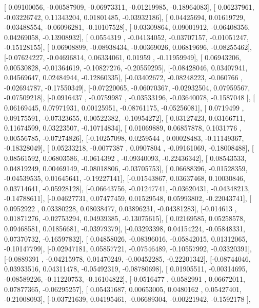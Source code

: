 \documentclass{article}
\begin{document}
       [ 0.09100056, -0.00587909, -0.06973311, -0.01219985, -0.18964083],
       [ 0.06237961, -0.03226742,  0.11343204,  0.01801485, -0.03932186],
       [ 0.04425694,  0.01619729, -0.03488554, -0.06096281, -0.10107528],
       [-0.03309864,  0.09001912, -0.06408356,  0.04269058, -0.13908932],
       [ 0.0554319 , -0.04134052, -0.03707157, -0.01051247, -0.15128155],
       [ 0.06908899, -0.08938434, -0.00369026,  0.06819696, -0.08255462],
       [-0.07624227, -0.04696814,  0.06334061,  0.01959   , -0.11959949],
       [ 0.06943206,  0.00530828, -0.01364619, -0.10827276, -0.20559295],
       [-0.08428046,  0.03407941,  0.04569647,  0.02484944, -0.12860335],
       [-0.03402672, -0.08248223, -0.060766  , -0.02694787, -0.17550349],
       [-0.07220065, -0.06070367, -0.02932504,  0.07959567, -0.07509218],
       [-0.0916437 , -0.0759987 , -0.03533196, -0.03640078, -0.1587048 ],
       [ 0.06169445,  0.07971931,  0.00125951, -0.08761175, -0.05256081],
       [ 0.0719499 ,  0.09175591, -0.07323655,  0.00522382, -0.10954272],
       [ 0.03127423,  0.03166711,  0.11674599,  0.03223507, -0.10714834],
       [ 0.01069889,  0.06857878,  0.1031776 ,  0.00556785, -0.07274826],
       [-0.10257098,  0.0259544 ,  0.00028483, -0.11149367, -0.18328049],
       [ 0.05233218, -0.0077387 ,  0.0907804 , -0.09161069, -0.18008488],
       [ 0.08561592,  0.06803586, -0.0614392 , -0.09340093, -0.22436342],
       [ 0.08543533,  0.04819249,  0.00469149, -0.08018806, -0.03705753],
       [ 0.06688396, -0.01528359, -0.04539535,  0.01645641, -0.19227141],
       [-0.01543867,  0.03637468,  0.10030846,  0.03714641, -0.05928128],
       [-0.06643756, -0.01247741, -0.03620431, -0.04348213, -0.14788611],
       [-0.04627731,  0.07477459,  0.01529548,  0.05993802, -0.22043741],
       [ 0.0952922 ,  0.03380228,  0.08038477,  0.03896231, -0.04381283],
       [-0.014613  ,  0.01871276, -0.02753294,  0.04939385, -0.13075615],
       [ 0.02169585,  0.05258578,  0.09468581,  0.01856681, -0.03979379],
       [-0.03293398,  0.04154224, -0.05848331,  0.07370732, -0.16597832],
       [ 0.04858026, -0.08396016, -0.05842015,  0.01312065, -0.10147799],
       [-0.02947181,  0.05857721, -0.07546489, -0.10557992, -0.03320391],
       [-0.0889391 , -0.04215978,  0.01470249, -0.00452285, -0.22201342],
       [-0.08744046,  0.03933516,  0.04311478, -0.05492319, -0.08780698],
       [ 0.01905511, -0.00314695, -0.08589226, -0.11220753, -0.16104822],
       [-0.0516477 ,  0.0582991 ,  0.06672011,  0.07877365, -0.06295257],
       [ 0.05431687,  0.00653005,  0.0480162 ,  0.05427401, -0.21008093],
       [-0.03721639,  0.04195461, -0.06689304, -0.00221942, -0.1592178 ],
\end{document}
